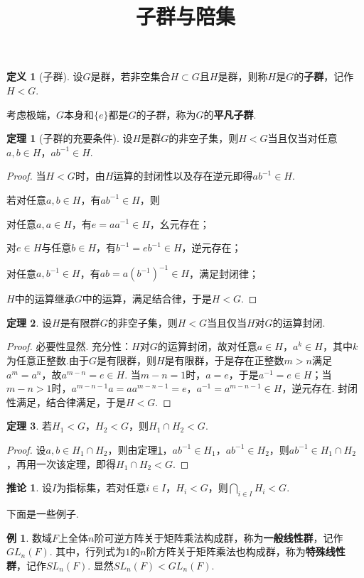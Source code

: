 \documentclass[12pt]{ctexart}
\title{\vspace{-2em}\textbf{子群与陪集}\vspace{-2em}}
\date{ }
\theoremstyle{definition}
\newtheorem{definition}{定义}
\newtheorem{theorem}{定理}
\newtheorem{corollary}{推论}
\newtheorem{example}{例}
\theoremstyle{plain}
\begin{document}
	\maketitle
	\begin{definition}[子群]
		设$G$是群，若非空集合$H\subset G$且$H$是群，则称$H$是$G$的\textbf{子群}，记作$H<G$.
	\end{definition}
	考虑极端，$G$本身和$\{e\}$都是$G$的子群，称为$G$的\textbf{平凡子群}.
	\begin{theorem}[子群的充要条件]\label{iff}
		设$H$是群$G$的非空子集，则$H<G$当且仅当对任意$a,b\in H$，$ab^{-1}\in H$.
	\end{theorem}
	\begin{proof}
		当$H<G$时，由$H$运算的封闭性以及存在逆元即得$ab^{-1}\in H$.
		
		若对任意$a,b\in H$，有$ab^{-1}\in H$，则
		
		对任意$a,a\in H$，有$e=aa^{-1}\in H$，幺元存在；
		
		对$e\in H$与任意$b\in H$，有$b^{-1}=eb^{-1}\in H$，逆元存在；
		
		对任意$a,b^{-1}\in H$，有$ab=a(b^{-1})^{-1}\in H$，满足封闭律；
		
		$H$中的运算继承$G$中的运算，满足结合律，于是$H<G$.
	\end{proof}
	\begin{theorem}
		设$H$是有限群$G$的非空子集，则$H<G$当且仅当$H$对$G$的运算封闭.
	\end{theorem}
	\begin{proof}
		必要性显然. 充分性：$H$对$G$的运算封闭，故对任意$a\in H$，$a^k\in H$，其中$k$为任意正整数.由于$G$是有限群，则$H$是有限群，于是存在正整数$m>n$满足$a^m=a^n$，故$a^{m-n}=e\in H$. 当$m-n=1$时，$a=e$，于是$a^{-1}=e\in H$；当$m-n>1$时，$a^{m-n-1}a=aa^{m-n-1}=e$，$a^{-1}=a^{m-n-1}\in H$，逆元存在. 封闭性满足，结合律满足，于是$H<G$.
	\end{proof}
	\begin{theorem}
		若$H_1<G$，$H_2<G$，则$H_1\cap H_2<G$.
	\end{theorem}
	\begin{proof}
		设$a,b\in H_1\cap H_2$，则由定理\ref{iff}，$ab^{-1}\in H_1$，$ab^{-1}\in H_2$，则$ab^{-1}\in H_1\cap H_2$，再用一次该定理，即得$H_1\cap H_2<G$.
	\end{proof}
	\begin{corollary}
		设$I$为指标集，若对任意$i\in I$，$H_i<G$，则$\bigcap_{i\in I}H_i<G$.
	\end{corollary}
	下面是一些例子.
	\begin{example}
		数域$F$上全体$n$阶可逆方阵关于矩阵乘法构成群，称为\textbf{一般线性群}，记作$GL_n(F)$. 其中，行列式为$1$的$n$阶方阵关于矩阵乘法也构成群，称为\textbf{特殊线性群}，记作$SL_n(F)$. 显然$SL_n(F)<GL_n(F)$.
	\end{example}
\end{document}
